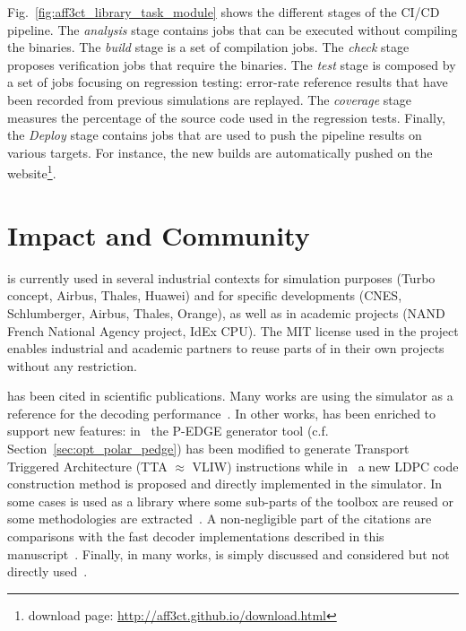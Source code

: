 Fig.~\ref{fig:aff3ct_library_task_module} shows the different stages of the
\AFFECT CI/CD pipeline. The \emph{analysis} stage contains jobs that can be
executed without compiling the \AFFECT binaries. The \emph{build} stage is a set
of compilation jobs. The \emph{check} stage proposes verification jobs that
require the \AFFECT binaries. The \emph{test} stage is composed by a set of jobs
focusing on regression testing: error-rate reference results that have been
recorded from previous simulations are replayed. The \emph{coverage} stage
measures the percentage of the \AFFECT source code used in the regression tests.
Finally, the \emph{Deploy} stage contains jobs that are used to push the
pipeline results on various targets. For instance, the new builds are
automatically pushed on the \AFFECT website\footnote{\AFFECT download page:
\url{http://aff3ct.github.io/download.html}}.

\section{Impact and Community}
\label{sec:aff3ct_impact}

\AFFECT is currently used in several industrial contexts for simulation purposes
(Turbo concept, Airbus, Thales, Huawei) and for specific developments (CNES,
Schlumberger, Airbus, Thales, Orange), as well as in academic projects (NAND
French National Agency project, IdEx CPU). The MIT license used in the project
enables industrial and academic partners to reuse parts of \AFFECT in their own
projects without any restriction.

\AFFECT has been cited in scientific publications. Many works are using the
\AFFECT simulator as a reference for the decoding performance~\cite{Pignoly2018,
Poulenard2018,Ghanaatian2018,Wang2019,Hsieh2020,Rush2020,Duffy2020}. In other
works, \AFFECT has been enriched to support new features:
in~\cite{Leonardon2018b} the P-EDGE generator tool (c.f.
Section~\ref{sec:opt_polar_pedge}) has been modified to generate Transport
Triggered Architecture (TTA $\approx$ VLIW) instructions while
in~\cite{Tasdighi2020} a new LDPC code construction method is proposed and
directly implemented in the \AFFECT simulator. In some cases \AFFECT is used as
a library where some sub-parts of the toolbox are reused or some methodologies
are extracted~\cite{Florian2018,Cavatassi2019a,Cavatassi2019b,Ercan2020}. A
non-negligible part of the citations are comparisons with the fast decoder
implementations described in this manuscript~\cite{Zeng2017,Leonardon2018a,
Guermouche2019,LeGal2019a,Shen2020}. Finally, in many works, \AFFECT is simply
discussed and considered but not directly used~\cite{Debbabi2016,Debbabi2016a,
Ercan2017,Natarajan2018,Cenova2019,Krainyk2019,Vameghestahbanati2019,
Mohammed2019,Shaheen2019,Aly2019,Delomier2020}.

